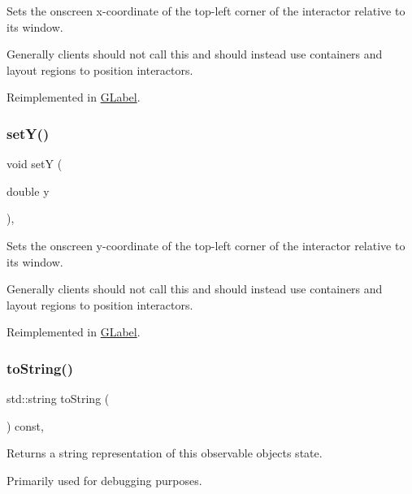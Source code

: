 Sets the onscreen x-\/coordinate of the top-\/left corner of the interactor relative to its window. 

Generally clients should not call this and should instead use containers and layout regions to position interactors. 

Reimplemented in \mbox{\hyperlink{classGLabel_af7260dc32f150e3a5072e7e8eb2628b1}{G\+Label}}.

\mbox{\label{classGInteractor_a7d57e2a5c35d27feb58fd498a3cf82b9}} 
\subsubsection{\texorpdfstring{set\+Y()}{setY()}}
{\footnotesize\ttfamily void setY (\begin{DoxyParamCaption}\item[{double}]{y }\end{DoxyParamCaption})\hspace{0.3cm}{\ttfamily [virtual]}, {\ttfamily [inherited]}}



Sets the onscreen y-\/coordinate of the top-\/left corner of the interactor relative to its window. 

Generally clients should not call this and should instead use containers and layout regions to position interactors. 

Reimplemented in \mbox{\hyperlink{classGLabel_a59633abb35b676c54d88ea6cd384fc55}{G\+Label}}.

\mbox{\label{classGObservable_a1fe5121d6528fdea3f243321b3fa3a49}} 
\subsubsection{\texorpdfstring{to\+String()}{toString()}}
{\footnotesize\ttfamily std\+::string to\+String (\begin{DoxyParamCaption}{ }\end{DoxyParamCaption}) const\hspace{0.3cm}{\ttfamily [virtual]}, {\ttfamily [inherited]}}



Returns a string representation of this observable object\textquotesingle{}s state. 

Primarily used for debugging purposes. 